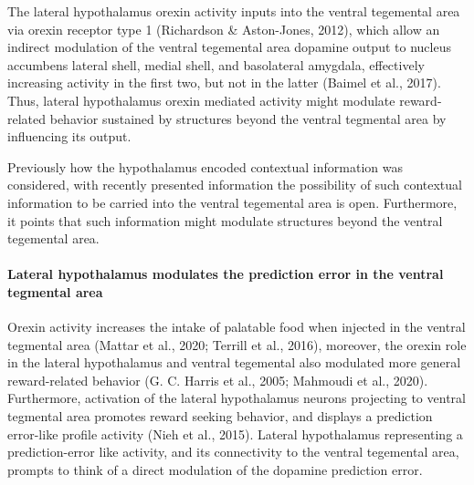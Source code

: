 \documentclass[
]{/home/nicoluarte/Downloads/templates/PNAS-template-main.tex}
\begin{document}
The lateral hypothalamus orexin activity inputs into the ventral
tegemental area via orexin receptor type 1 (Richardson \& Aston-Jones,
2012), which allow an indirect modulation of the ventral tegemental area
dopamine output to nucleus accumbens lateral shell, medial shell, and
basolateral amygdala, effectively increasing activity in the first two,
but not in the latter (Baimel et al., 2017). Thus, lateral hypothalamus
orexin mediated activity might modulate reward-related behavior
sustained by structures beyond the ventral tegmental area by influencing
its output.

Previously how the hypothalamus encoded contextual information was
considered, with recently presented information the possibility of such
contextual information to be carried into the ventral tegemental area is
open. Furthermore, it points that such information might modulate
structures beyond the ventral tegemental area.

\hypertarget{lateral-hypothalamus-modulates-the-prediction-error-in-the-ventral-tegmental-area}{%
\paragraph{Lateral hypothalamus modulates the prediction error in the
ventral tegmental
area}\label{lateral-hypothalamus-modulates-the-prediction-error-in-the-ventral-tegmental-area}}

Orexin activity increases the intake of palatable food when injected in
the ventral tegmental area (Mattar et al., 2020; Terrill et al., 2016),
moreover, the orexin role in the lateral hypothalamus and ventral
tegemental also modulated more general reward-related behavior (G. C.
Harris et al., 2005; Mahmoudi et al., 2020). Furthermore, activation of
the lateral hypothalamus neurons projecting to ventral tegmental area
promotes reward seeking behavior, and displays a prediction error-like
profile activity (Nieh et al., 2015). Lateral hypothalamus representing
a prediction-error like activity, and its connectivity to the ventral
tegemental area, prompts to think of a direct modulation of the dopamine
prediction error.
\end{document}
